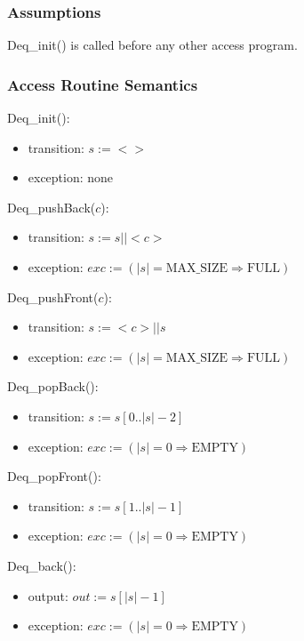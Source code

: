 \documentclass[12pt,fleqn]{article}
\begin{document}
\subsubsection* {Assumptions}
Deq\_init() is called before any other access program.

\subsubsection* {Access Routine Semantics}

Deq\_init():
\begin{itemize}
\item transition: $s := < >$
\item exception: none
\end{itemize}

\noindent Deq\_pushBack($c$):
\begin{itemize}
\item transition: $s := s || <c>$
\item exception: $exc := (|s| = \mbox{MAX\_SIZE} \Rightarrow  \mbox{FULL})$
\end{itemize}

\noindent Deq\_pushFront($c$):
\begin{itemize}
\item transition: $s := <c> || s $
\item exception:  $exc := (|s| = \mbox{MAX\_SIZE} \Rightarrow  \mbox{FULL})$
\end{itemize}

\noindent Deq\_popBack():
\begin{itemize}
\item transition: $s := s[0..|s| - 2]$
\item exception: $exc := (|s| = 0 \Rightarrow \mbox{EMPTY})$
\end{itemize}

\noindent Deq\_popFront():
\begin{itemize}
\item transition: $s := s[1..|s| - 1]$
\item exception: $exc := (|s| = 0 \Rightarrow \mbox{EMPTY})$
\end{itemize}

\noindent Deq\_back():
\begin{itemize}
\item output: $out := s[|s| - 1]$
\item exception: $exc := (|s| = 0 \Rightarrow \mbox{EMPTY})$
\end{itemize}
\end{document}
